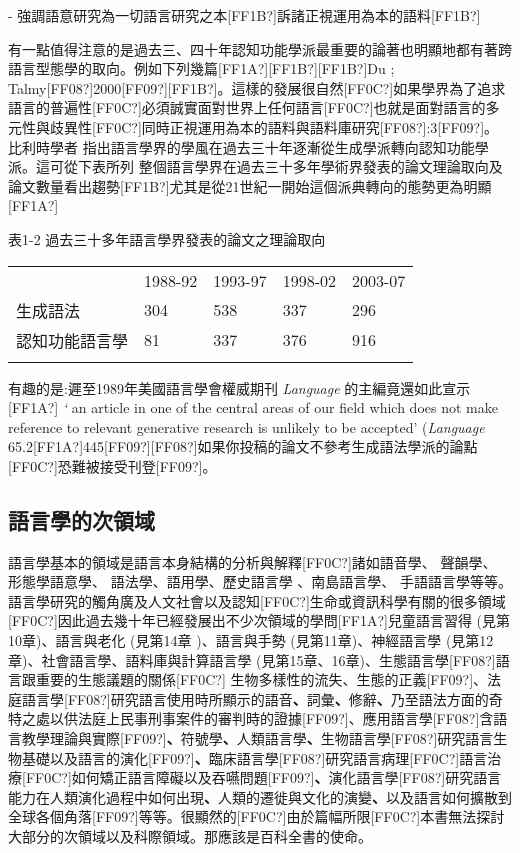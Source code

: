 {}-  強調語意研究為一切語言研究之本[FF1B?]訴諸正視運用為本的語料[FF1B?]

有一點值得注意的是過去三、四十年認知功能學派最重要的論著也明顯地都有著跨語言型態學的取向。例如下列幾篇[FF1A?]\citet{Givon1979}[FF1B?]\citet{HopperThompson1980}[FF1B?]Du \citet{Bois1987}; Talmy[FF08?]2000[FF09?][FF1B?]\citet{Bybee2010}。這樣的發展很自然[FF0C?]如果學界為了追求語言的普遍性[FF0C?]必須誠實面對世界上任何語言[FF0C?]也就是面對語言的多元性與歧異性[FF0C?]同時正視運用為本的語料與語料庫研究[FF08?]\citealt{Langacker1987}:3[FF09?]。比利時學者\citet{Geeraerts2010} 指出語言學界的學風在過去三十年逐漸從生成學派轉向認知功能學派。這可從下表所列 整個語言學界在過去三十多年學術界發表的論文理論取向及論文數量看出趨勢[FF1B?]尤其是從21世紀一開始這個派典轉向的態勢更為明顯[FF1A?]

表1-2  過去三十多年語言學界發表的論文之理論取向

\tablefirsthead{}

\tabletail{}
\tablelasttail{}
\begin{tabularx}{\textwidth}{XXXXX} & 1988-92 & 1993-97 & 1998-02 & 2003-07\\
\lsptoprule
生成語法 & 304 & 538 & 337 & 296\\
認知功能語言學 & 81 & 337 & 376 & 916\\
\lspbottomrule
\end{tabularx}
有趣的是:遲至1989年美國語言學會權威期刊 \textit{Language} 的主編竟還如此宣示[FF1A?] \textit{‘} an article in one of the central areas of our field which does not make reference to relevant generative research is unlikely to be accepted’ (\textit{Language} 65.2[FF1A?]445[FF09?][FF08?]如果你投稿的論文不參考生成語法學派的論點[FF0C?]恐難被接受刊登[FF09?]。

\subsection{語言學的次領域} %

語言學基本的領域是語言本身結構的分析與解釋[FF0C?]諸如語音學、 聲韻學、 形態學語意學、 語法學、語用學、歷史語言學 、南島語言學、 手語語言學等等。語言學研究的觸角廣及人文社會以及認知[FF0C?]生命或資訊科學有關的很多領域[FF0C?]因此過去幾十年已經發展出不少次領域的學問[FF1A?]兒童語言習得 (見第10章)、語言與老化 (見第14章 )、語言與手勢 (見第11章)、神經語言學 (見第12章)、社會語言學、語料庫與計算語言學 (見第15章、16章)、生態語言學[FF08?]語言跟重要的生態議題的關係[FF0C?] 生物多樣性的流失、生態的正義[FF09?]、法庭語言學[FF08?]研究語言使用時所顯示的語音\textbf{、}詞彙\textbf{、}修辭\textbf{、}乃至語法方面的奇特之處以供法庭上民事刑事案件的審判時的證據[FF09?]、應用語言學[FF08?]含語言教學理論與實際[FF09?]\textbf{、}符號學\textbf{、}人類語言學\textbf{、}生物語言學[FF08?]研究語言生物基礎以及語言的演化[FF09?]\textbf{、}臨床語言學[FF08?]研究語言病理[FF0C?]語言治療[FF0C?]如何矯正語言障礙以及吞嚥問題[FF09?]\textbf{、}演化語言學[FF08?]研究語言能力在人類演化過程中如何出現\textbf{、}人類的遷徙與文化的演變\textbf{、}以及語言如何擴散到全球各個角落[FF09?]等等。很顯然的[FF0C?]由於篇幅所限[FF0C?]本書無法探討大部分的次領域以及科際領域。那應該是百科全書的使命。

